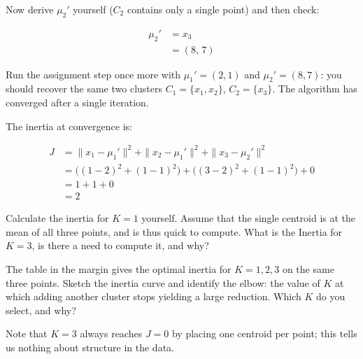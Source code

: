 Now derive $\mu_2'$ yourself ($C_2$ contains only a single point) and then check:

\begin{align*}
    \mu_2' &= x_3 \\
           &= (8,\,7)
\end{align*}

\vspace{0.5em}

Run the assignment step once more with $\mu_1'{=}(2,1)$ and $\mu_2'{=}(8,7)$: you should recover the same two clusters $C_1{=}\{x_1,x_2\}$, $C_2{=}\{x_3\}$.
The algorithm has converged after a single iteration.

The inertia at convergence is:

\begin{align*}
    J &= \|x_1-\mu_1'\|^2 + \|x_2-\mu_1'\|^2 + \|x_3-\mu_2'\|^2 \\
      &= \bigl((1{-}2)^2+(1{-}1)^2\bigr) + \bigl((3{-}2)^2+(1{-}1)^2\bigr) + 0 \\
      &= 1 + 1 + 0 \\
      &= 2
\end{align*}

Calculate the inertia for $K=1$ yourself. Assume that the single centroid is at the mean of all three points, and is thus quick to compute.
What is the Inertia for $K=3$, is there a need to compute it, and why?

\vspace{2.5em}
The table in the margin gives the optimal inertia for $K = 1, 2, 3$ on the same three points.
Sketch the inertia curve and identify the elbow: the value of $K$ at which adding another cluster stops yielding a large reduction.
Which $K$ do you select, and why?



Note that $K{=}3$ always reaches $J{=}0$ by placing one centroid per point; this tells us nothing about structure in the data.




